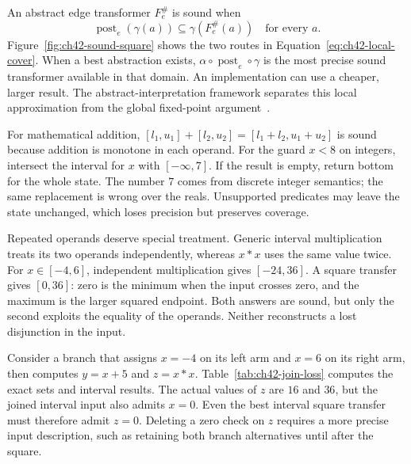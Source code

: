 An abstract edge transformer $F_e^\#$ is sound when
\begin{equation}
 \operatorname{post}_e(\gamma(a))\subseteq\gamma(F_e^\#(a))
 \quad\text{for every }a.
 \label{eq:ch42-local-cover}
\end{equation}
Figure~\ref{fig:ch42-sound-square} shows the two routes in Equation~\ref{eq:ch42-local-cover}.
When a best abstraction exists, $\alpha\circ\operatorname{post}_e\circ\gamma$ is the most precise sound transformer available in that domain.
An implementation can use a cheaper, larger result.
The abstract-interpretation framework separates this local approximation from the global fixed-point argument~\cite{cousot-1977-abstract}.



For mathematical addition, $[l_1,u_1]+[l_2,u_2]=[l_1+l_2,u_1+u_2]$ is sound because addition is monotone in each operand.
For the guard $x<8$ on integers, intersect the interval for $x$ with $[-\infty,7]$.
If the result is empty, return bottom for the whole state.
The number $7$ comes from discrete integer semantics; the same replacement is wrong over the reals.
Unsupported predicates may leave the state unchanged, which loses precision but preserves coverage.

Repeated operands deserve special treatment.
Generic interval multiplication treats its two operands independently, whereas $x*x$ uses the same value twice.
For $x\in[-4,6]$, independent multiplication gives $[-24,36]$.
A square transfer gives $[0,36]$: zero is the minimum when the input crosses zero, and the maximum is the larger squared endpoint.
Both answers are sound, but only the second exploits the equality of the operands.
Neither reconstructs a lost disjunction in the input.

Consider a branch that assigns $x=-4$ on its left arm and $x=6$ on its right arm, then computes $y=x+5$ and $z=x*x$.
Table~\ref{tab:ch42-join-loss} computes the exact sets and interval results.
The actual values of $z$ are $16$ and $36$, but the joined interval input also admits $x=0$.
Even the best interval square transfer must therefore admit $z=0$.
Deleting a zero check on $z$ requires a more precise input description, such as retaining both branch alternatives until after the square.

